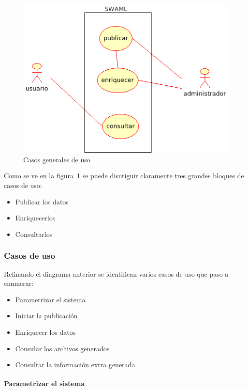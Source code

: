 \begin{figure}[ht]
 	\centering
	\includegraphics[width=12cm]{images/uml/casos-uso/general.png}
	\caption{Casos generales de uso}
	\label{uml:casos-uso}
\end{figure}

Como se ve en la figura~\ref{uml:casos-uso} se puede disntiguir claramente
tres grandes bloques de casos de uso:

\begin{itemize}
 \item Publicar los datos
 \item Enriquecerlos
 \item Consultarlos
\end{itemize}

\subsubsection{Casos de uso}

Refinando el diagrama anterior se identifican varios casos de uso que paso a
enumerar:

\begin{itemize}
 \item Parametrizar el sistema
 \item Iniciar la publicación
 \item Enriquecer los datos
 \item Consular los archivos generados
 \item Consultar la información extra generada
\end{itemize}


\paragraph{Parametrizar el sistema}

